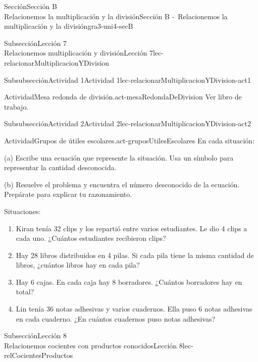 \begin{sectionptx}{Sección}{{\Large Sección B\\}Relacionemos la multiplicación y la división}{}{Sección B -~Relacionemos la multiplicación y la división}{}{}{gra3-uni4-secB}
\begin{subsectionptx}{Subsección}{{\normalsize Lección 7\\[-0.05cm]}Relacionemos multiplicación y división}{}{Lección 7}{}{}{lec-relacionarMultiplicacionYDivision}
\begin{subsubsectionptx}{Subsubsección}{Actividad 1}{}{Actividad 1}{}{}{lec-relacionarMultiplicacionYDivision-act1}
\begin{activity}{Actividad}{Mesa redonda de división.}{act-mesaRedondaDeDivision}
Ver libro de trabajo.
\end{activity}%
\end{subsubsectionptx}
%
%
\typeout{************************************************}
\typeout{************************************************}
%
\begin{subsubsectionptx}{Subsubsección}{Actividad 2}{}{Actividad 2}{}{}{lec-relacionarMultiplicacionYDivision-act2}
\begin{activity}{Actividad}{Grupos de útiles escolares.}{act-gruposUtilesEscolares}%
En cada situación:%
\par
(a) Escribe una ecuación que represente la situación. Usa un símbolo para representar la cantidad desconocida.%
\par
(b) Resuelve el problema y encuentra el número desconocido de la ecuación. Prepárate para explicar tu razonamiento.%
\par
Situaciones:%
%
\begin{enumerate}
\item{}Kiran tenía 32 clips y los repartió entre varios estudiantes. Le dio 4 clips a cada uno. ¿Cuántos estudiantes recibieron clips?%
\item{}Hay 28 libros distribuidos en 4 pilas. Si cada pila tiene la misma cantidad de libros, ¿cuántos libros hay en cada pila?%
\item{}Hay 6 cajas. En cada caja hay 8 borradores. ¿Cuántos borradores hay en total?%
\item{}Lin tenía 36 notas adhesivas y varios cuadernos. Ella puso 6 notas adhesivas en cada cuaderno. ¿En cuántos cuadernos puso notas adhesivas?%
\end{enumerate}
\end{activity}%
\end{subsubsectionptx}
\end{subsectionptx}
%
%
\typeout{************************************************}
\typeout{************************************************}
%
\begin{subsectionptx}{Subsección}{{\normalsize Lección 8\\[-0.05cm]}Relacionemos cocientes con productos conocidos}{}{Lección 8}{}{}{lec-relCocientesProductos}

\end{subsectionptx}
\end{sectionptx}
